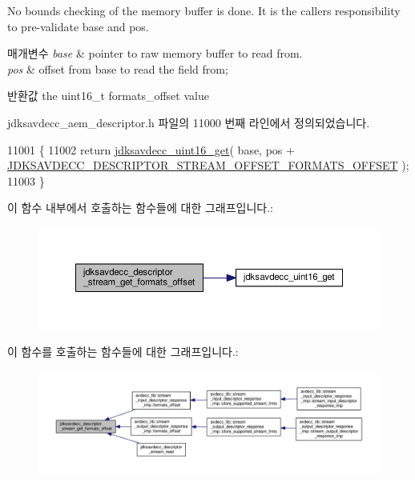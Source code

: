 No bounds checking of the memory buffer is done. It is the caller\textquotesingle{}s responsibility to pre-\/validate base and pos.


\begin{DoxyParams}{매개변수}
{\em base} & pointer to raw memory buffer to read from. \\
\hline
{\em pos} & offset from base to read the field from; \\
\hline
\end{DoxyParams}
\begin{DoxyReturn}{반환값}
the uint16\+\_\+t formats\+\_\+offset value 
\end{DoxyReturn}


jdksavdecc\+\_\+aem\+\_\+descriptor.\+h 파일의 11000 번째 라인에서 정의되었습니다.


\begin{DoxyCode}
11001 \{
11002     \textcolor{keywordflow}{return} \hyperlink{group__endian_ga3fbbbc20be954aa61e039872965b0dc9}{jdksavdecc\_uint16\_get}( base, pos + 
      \hyperlink{group__descriptor__stream_gaa903203acf8683af611fdff61a45d61d}{JDKSAVDECC\_DESCRIPTOR\_STREAM\_OFFSET\_FORMATS\_OFFSET} );
11003 \}
\end{DoxyCode}


이 함수 내부에서 호출하는 함수들에 대한 그래프입니다.\+:
\nopagebreak
\begin{figure}[H]
\begin{center}
\leavevmode
\includegraphics[width=350pt]{group__descriptor__stream_ga20a99e3ab9e02e92655a28e2ce5661c1_cgraph}
\end{center}
\end{figure}




이 함수를 호출하는 함수들에 대한 그래프입니다.\+:
\nopagebreak
\begin{figure}[H]
\begin{center}
\leavevmode
\includegraphics[width=350pt]{group__descriptor__stream_ga20a99e3ab9e02e92655a28e2ce5661c1_icgraph}
\end{center}
\end{figure}


